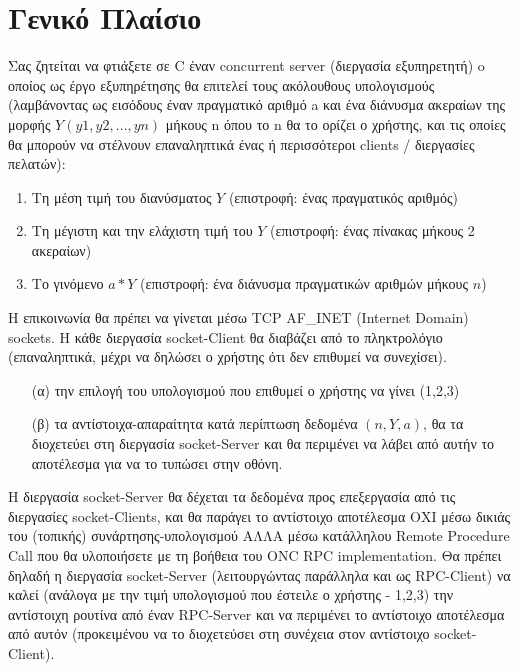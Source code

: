 %
%
\setcounter{section}{0}
\section*{Γενικό Πλαίσιο}


\noindent
Σας ζητείται να φτιάξετε σε C έναν concurrent  server (διεργασία εξυπηρετητή) o οποίος ως έργο εξυπηρέτησης θα επιτελεί τους ακόλουθους υπολογισμούς (λαμβάνοντας ως εισόδους έναν πραγματικό αριθμό a και ένα διάνυσμα ακεραίων της μορφής \(Y (y1,y2,…,yn)\) μήκους n όπου το n θα το ορίζει ο χρήστης, και τις οποίες θα μπορούν να στέλνουν επαναληπτικά ένας ή περισσότεροι clients  / διεργασίες πελατών):

\begin{enumerate}
	\item Τη μέση τιμή του διανύσματος \(Y\) (επιστροφή: ένας πραγματικός αριθμός)
	\item Τη μέγιστη και την ελάχιστη τιμή του \(Y\) (επιστροφή: ένας πίνακας μήκους 2 ακεραίων)
	\item Το γινόμενο \(a*Y\) (επιστροφή: ένα διάνυσμα πραγματικών αριθμών μήκους \(n\))
\end{enumerate}

\noindent
Η επικοινωνία θα πρέπει να γίνεται μέσω TCP AF\_INET (Internet Domain) sockets. Η κάθε διεργασία socket-Client θα διαβάζει από το πληκτρολόγιο (επαναληπτικά, μέχρι να δηλώσει ο χρήστης ότι δεν επιθυμεί να συνεχίσει).
\begin{itemize}
	\item[(α)] την επιλογή του υπολογισμού που επιθυμεί ο χρήστης να γίνει (1,2,3)
	\item[(β)]  τα αντίστοιχα-απαραίτητα κατά περίπτωση δεδομένα \((n, Y, a)\), θα τα διοχετεύει στη διεργασία socket-Server και θα περιμένει να λάβει από αυτήν το αποτέλεσμα για να το τυπώσει στην οθόνη.
\end{itemize}


\noindent
Η διεργασία socket-Server θα δέχεται τα δεδομένα προς επεξεργασία από τις διεργασίες socket-Clients, και θα παράγει το αντίστοιχο αποτέλεσμα ΟΧΙ μέσω δικιάς του (τοπικής) συνάρτησης-υπολογισμού ΑΛΛΑ μέσω κατάλληλου Remote Procedure Call που θα υλοποιήσετε με τη βοήθεια του ONC RPC implementation. Θα πρέπει δηλαδή η διεργασία socket-Server (λειτουργώντας παράλληλα και ως RPC-Client) να καλεί (ανάλογα με την τιμή υπολογισμού που έστειλε ο χρήστης - 1,2,3) την αντίστοιχη ρουτίνα από έναν RPC-Server και να περιμένει το αντίστοιχο αποτέλεσμα από αυτόν (προκειμένου να το διοχετεύσει στη συνέχεια στον αντίστοιχο socket-Client).  

